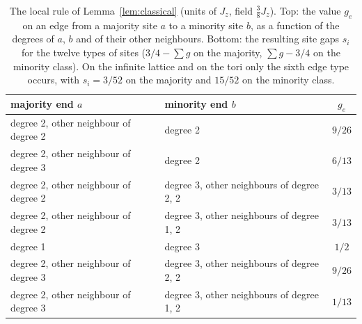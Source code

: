 \documentclass[aps,prx,onecolumn,10pt,nofootinbib,longbibliography,floatfix]{revtex4-2}
\theoremstyle{remark}
\newcommand{\Jz}{J_z}
\begin{document}
\begin{table}[h]
\caption{The local rule of Lemma~\ref{lem:classical} (units of $\Jz$, field $\frac38\Jz$). Top: the value $g_e$ on an
edge from a majority site $a$ to a minority site $b$, as a function of the degrees of $a$, $b$ and of their other
neighbours. Bottom: the resulting site gaps $s_i$ for the twelve types of sites ($3/4-\sum g$ on the majority,
$\sum g-3/4$ on the minority class). On the infinite lattice and on the tori only the sixth edge type occurs, with
$s_i=3/52$ on the majority and $15/52$ on the minority class.} %
\label{tab:rule}
\begin{tabular}{l@{\qquad}l@{\qquad}c}
majority end $a$ & minority end $b$ & $g_e$\\ \hline
degree 2, other neighbour of degree 2 & degree 2 & $9/26$\\ %
degree 2, other neighbour of degree 3 & degree 2 & $6/13$\\ %
degree 2, other neighbour of degree 2 & degree 3, other neighbours of degree 2, 2 & $3/13$\\ %
degree 2, other neighbour of degree 2 & degree 3, other neighbours of degree 1, 2 & $3/13$\\ %
degree 1 & degree 3 & $1/2$\\ %
degree 2, other neighbour of degree 3 & degree 3, other neighbours of degree 2, 2 & $9/26$\\ %
degree 2, other neighbour of degree 3 & degree 3, other neighbours of degree 1, 2 & $1/13$\\ %
\end{tabular}


\end{table}
\end{document}
